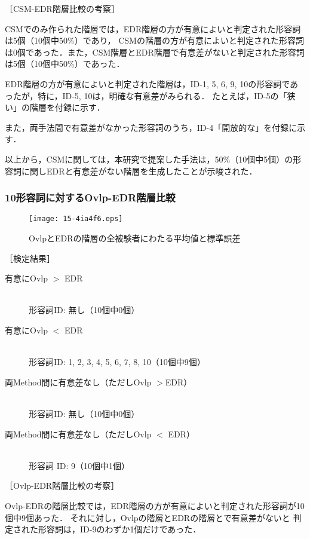 \documentclass[japanese]{jnlp_1.4}
\begin{document}
\noindent
［CSM-EDR階層比較の考察］

CSMでのみ作られた階層では，EDR階層の方が有意によいと判定された形容詞は5個（10個中50\%）であり，
CSMの階層の方が有意によいと判定された形容詞は0個であった．また，CSM階層とEDR階層で有意差がないと判定された形容詞は5個（10個中50\%）であった．

EDR階層の方が有意によいと判定された階層は，ID-1, 5, 6, 9, 10の形容詞であったが，特に，ID-5, 10は，明確な有意差がみられる．
たとえば，ID-5の「狭い」の階層を付録に示す．

また，両手法間で有意差がなかった形容詞のうち，ID-4「開放的な」を付録に示す．

以上から，CSMに関しては，本研究で提案した手法は，50\%（10個中5個）の形容詞に関しEDRと有意差がない階層を生成したことが示唆された．



\subsubsection{ 10形容詞に対するOvlp-EDR階層比較}


\begin{figure}[b]
\begin{center}
\texttt{[image: 15-4ia4f6.eps]}
\end{center}
\caption{OvlpとEDRの階層の全被験者にわたる平均値と標準誤差}
\end{figure}

\noindent
［検定結果］
\begin{description}
\item[有意にOvlp $>$ EDR] \mbox{} \\
形容詞ID: 無し（10個中0個）
\item[有意にOvlp $<$ EDR] \mbox{} \\
形容詞ID: 1, 2, 3, 4, 5, 6, 7, 8, 10（10個中9個）
\item[両Method間に有意差なし（ただしOvlp $>$EDR）] \mbox{} \\
形容詞ID: 無し（10個中0個）
\item[両Method間に有意差なし（ただしOvlp $<$ EDR）] \mbox{} \\
形容詞 ID: 9（10個中1個）
\end{description}

\noindent
［Ovlp-EDR階層比較の考察］ 


Ovlp-EDRの階層比較では，EDR階層の方が有意によいと判定された形容詞が10個中9個あった．
それに対し，Ovlpの階層とEDRの階層とで有意差がないと
判定された形容詞は，ID-9のわずか1個だけであった．
\end{document}
